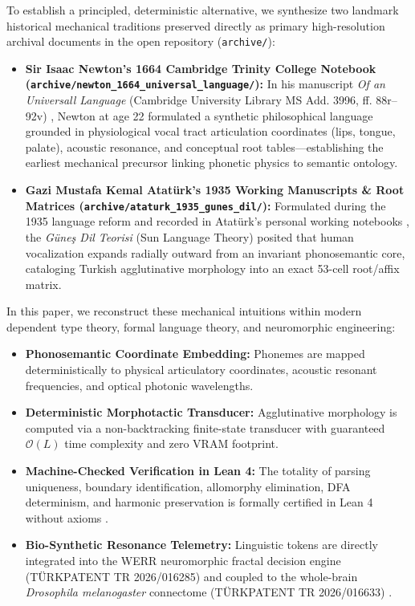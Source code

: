 \documentclass[11pt,a4paper]{article}
\begin{document}
To establish a principled, deterministic alternative, we synthesize two landmark historical mechanical traditions preserved directly as primary high-resolution archival documents in the open repository (\texttt{archive/}):
\begin{itemize}
    \item \textbf{Sir Isaac Newton's 1664 Cambridge Trinity College Notebook (\texttt{archive/newton\_1664\_universal\_language/}):} In his manuscript \textit{Of an Universall Language} (Cambridge University Library MS Add. 3996, ff. 88r--92v) \cite{newton1664universal}, Newton at age 22 formulated a synthetic philosophical language grounded in physiological vocal tract articulation coordinates (lips, tongue, palate), acoustic resonance, and conceptual root tables---establishing the earliest mechanical precursor linking phonetic physics to semantic ontology.
    \item \textbf{Gazi Mustafa Kemal Atatürk's 1935 Working Manuscripts \& Root Matrices (\texttt{archive/ataturk\_1935\_gunes\_dil/}):} Formulated during the 1935 language reform and recorded in Atatürk's personal working notebooks \cite{ataturk1935nobet, kosay1936gunes, tdk1936kurultay}, the \textit{Güneş Dil Teorisi} (Sun Language Theory) posited that human vocalization expands radially outward from an invariant phonosemantic core, cataloging Turkish agglutinative morphology into an exact 53-cell root/affix matrix.
\end{itemize}

In this paper, we reconstruct these mechanical intuitions within modern dependent type theory, formal language theory, and neuromorphic engineering:
\begin{itemize}
    \item \textbf{Phonosemantic Coordinate Embedding:} Phonemes are mapped deterministically to physical articulatory coordinates, acoustic resonant frequencies, and optical photonic wavelengths.
    \item \textbf{Deterministic Morphotactic Transducer:} Agglutinative morphology is computed via a non-backtracking finite-state transducer with guaranteed $\mathcal{O}(L)$ time complexity and zero VRAM footprint.
    \item \textbf{Machine-Checked Verification in Lean 4:} The totality of parsing uniqueness, boundary identification, allomorphy elimination, DFA determinism, and harmonic preservation is formally certified in Lean 4 without axioms \cite{moura2021lean4}.
    \item \textbf{Bio-Synthetic Resonance Telemetry:} Linguistic tokens are directly integrated into the WERR neuromorphic fractal decision engine (TÜRKPATENT TR 2026/016285) \cite{dagli2026werr1, dagli2026werr2} and coupled to the whole-brain \textit{Drosophila melanogaster} connectome (TÜRKPATENT TR 2026/016633) \cite{dagli2026werrsoma, dorkenwald2024flywire, schlegel2024whole}.
\end{itemize}
\end{document}
